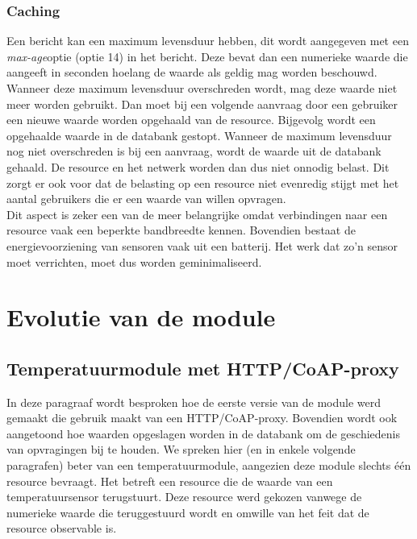 \subsubsection{Caching}\label{caching}
Een bericht kan een maximum levensduur hebben, dit wordt aangegeven met een \textit{max-age}optie (optie 14) in het bericht. Deze bevat dan een numerieke waarde die aangeeft in seconden hoelang de waarde als geldig mag worden beschouwd. Wanneer deze maximum levensduur overschreden wordt, mag deze waarde niet meer worden gebruikt. Dan moet bij een volgende aanvraag door een gebruiker een nieuwe waarde worden opgehaald van de resource. Bijgevolg wordt een opgehaalde waarde in de databank gestopt. Wanneer de maximum levensduur nog niet overschreden is bij een aanvraag, wordt de waarde uit de databank gehaald. De resource en het netwerk worden dan dus niet onnodig belast. Dit zorgt er ook voor dat de belasting op een resource niet evenredig stijgt met het aantal gebruikers die er een waarde van willen opvragen.\\
Dit aspect is zeker een van de meer belangrijke omdat verbindingen naar een resource vaak een beperkte bandbreedte kennen. Bovendien bestaat de energievoorziening van sensoren vaak uit een batterij. Het werk dat zo'n sensor moet verrichten, moet dus worden geminimaliseerd.

\section{Evolutie van de module} \label{evolutie}

\subsection{Temperatuurmodule met HTTP/CoAP-proxy} \label{proxy}
In deze paragraaf wordt besproken hoe de eerste versie van de module werd gemaakt die gebruik maakt van een HTTP/CoAP-proxy. Bovendien wordt ook aangetoond hoe waarden opgeslagen worden in de databank om de geschiedenis van opvragingen bij te houden. We spreken hier (en in enkele volgende paragrafen) beter van een temperatuurmodule, aangezien deze module slechts \'{e}\'{e}n resource bevraagt. Het betreft een resource die de waarde van een temperatuursensor terugstuurt. Deze resource werd gekozen vanwege de numerieke waarde die teruggestuurd wordt en omwille van het feit dat de resource observable is.\\

